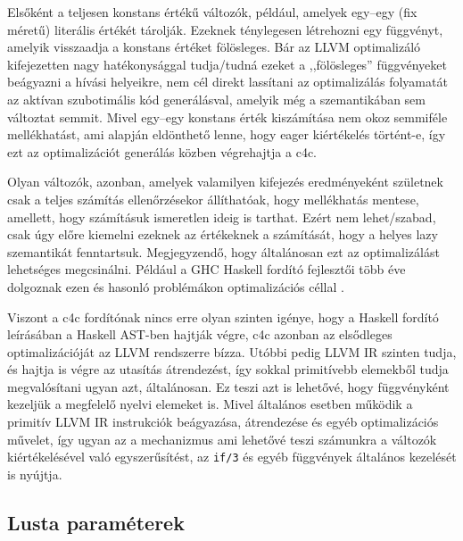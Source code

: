 \documentclass[magyar,12pt,a4paper,final,titlepage]{report}
\def\inlcode#1{{\color{inline-code-color}\tt #1}}
\begin{document}
    Elsőként a teljesen konstans értékű változók, például, amelyek egy--egy (fix méretű) literális értékét tárolják.
    Ezeknek ténylegesen létrehozni egy függvényt, amelyik visszaadja a konstans értéket fölösleges.
    Bár az LLVM optimalizáló kifejezetten nagy hatékonysággal tudja/tudná ezeket a ,,fölösleges'' függvényeket beágyazni a hívási helyeikre, nem cél direkt lassítani az optimalizálás folyamatát az aktívan szubotimális kód generálásval, amelyik még a szemantikában sem változtat semmit.
    Mivel egy--egy konstans érték kiszámítása nem okoz semmiféle mellékhatást, ami alapján eldönthető lenne, hogy \gls{eager} kiértékelés történt-e, így ezt az optimalizációt generálás közben végrehajtja a c4c.

    Olyan változók, azonban, amelyek valamilyen kifejezés eredményeként születnek csak a teljes számítás ellenőrzésekor állíthatóak, hogy mellékhatás mentese, amellett, hogy számításuk ismeretlen ideig is tarthat.
    Ezért nem lehet/szabad, csak úgy előre kiemelni ezeknek az értékeknek a számítását, hogy a helyes \gls{lazy} szemantikát fenntartsuk.
    Megjegyzendő, hogy általánosan ezt az optimalizálást lehetséges megcsinálni.
    Például a GHC Haskell fordító fejlesztői több éve dolgoznak ezen és hasonló problémákon optimalizációs céllal \cite{sergey_modular_2014} \cite{sergey_theory_2017}.

    Viszont a c4c fordítónak nincs erre olyan szinten igénye, hogy a Haskell fordító leírásában a Haskell \gls{AST}-ben hajtják végre, c4c azonban az elsődleges optimalizációját az LLVM rendszerre bízza.
    Utóbbi pedig LLVM \gls{IR} szinten tudja, és hajtja is végre az utasítás átrendezést, így sokkal primitívebb elemekből tudja megvalósítani ugyan azt, általánosan.
    Ez teszi azt is lehetővé, hogy függvényként kezeljük a megfelelő nyelvi elemeket is.
    Mivel általános esetben működik a primitív LLVM \gls{IR} instrukciók beágyazása, átrendezése és egyéb optimalizációs művelet, így ugyan az a mechanizmus ami lehetővé teszi számunkra a változók kiértékelésével való egyszerűsítést, az \inlcode{if/3} és egyéb függvények általános kezelését is nyújtja.

    \subsection{Lusta paraméterek}
\end{document}
